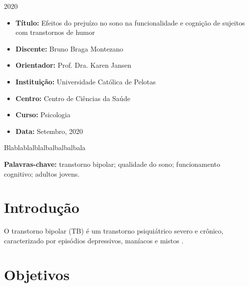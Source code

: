 \documentclass[chapter=TITLE,oneside,12pt,a4paper,english,brazil]{abntex2} %
\renewcommand{\ABNTEXchapterfont}{\normalfont\fontseries{b}\selectfont}
\renewcommand{\imprimircapa}{%
    \begin{capa}%
        \center
        \ABNTEXchapterfont\Large\imprimirinstituicao

        \vspace*{1cm}

        {\ABNTEXchapterfont\Large\imprimirautor}

        \vfill
        \begin{center}
            \ABNTEXchapterfont\bfseries\LARGE\imprimirtitulo
        \end{center}
        \vfill

        \large\imprimirlocal

        \large{2020}

        \vspace*{1cm}
    \end{capa}
}
\begin{document}
\imprimircapa

\imprimirfolhaderosto

\label{sec:identificacao}

\begin{itemize}
    \item \textbf{Título:} Efeitos do prejuízo no sono na funcionalidade
    e cognição de sujeitos com transtornos de humor
    \item \textbf{Discente:} Bruno Braga Montezano
    \item \textbf{Orientador:} Prof. Dra. Karen Jansen
    \item \textbf{Instituição:} Universidade Católica de Pelotas
    \item \textbf{Centro:} Centro de Ciências da Saúde
    \item \textbf{Curso:} Psicologia
    \item \textbf{Data:} Setembro, 2020
\end{itemize}

\newpage
\begin{KeepFromToc}
\tableofcontents
\end{KeepFromToc}
\newpage

\begin{resumo}

    Blablablalblalbalbalbalbala

    \vspace{\onelineskip}

    \textbf{Palavras-chave:} transtorno bipolar; qualidade do sono;
    funcionamento cognitivo; adultos jovens.
\end{resumo}

\textual

\begingroup
\renewcommand{\cleardoublepage}{}
\renewcommand{\clearpage}{}

\chapter{Introdução}\label{sec:introducao}

    O transtorno bipolar (TB) é um transtorno psiquiátrico severo e crônico,
    caracterizado por episódios depressivos, maníacos e mistos
    \parencite{american_psychiatric_association_diagnostic_2013}.

\vspace{\onelineskip}
\chapter{Objetivos}\label{sec:objetivos}
\end{document}
